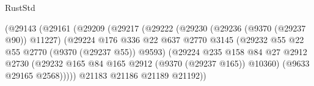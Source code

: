 \begin{lexlean}{RustStd}
\begin{coremodule}
                                            (@29143
                                              (@29161
                                                (@29209
                                                  (@29217
                                                    (@29222
                                                      (@29230
                                                        (@29236 (@9370 (@29237 @90)) @11227)
                                                        (@29224
                                                          @176
                                                          @336
                                                          @22
                                                          @637
                                                          @2770
                                                          @3145
                                                          (@29232
                                                            @55
                                                            @22
                                                            @55
                                                            @2770
                                                            (@9370 (@29237 @55))
                                                            @9593)
                                                          (@29224
                                                            @235
                                                            @158
                                                            @84
                                                            @27
                                                            @2912
                                                            @2730
                                                            (@29232
                                                              @165
                                                              @84
                                                              @165
                                                              @2912
                                                              (@9370 (@29237 @165))
                                                              @10360)
                                                            (@9633 @29165 @2568)))))
                                                    @21183
                                                    @21186
                                                    @21189
                                                    @21192))

\end{coremodule}
\end{lexlean}
